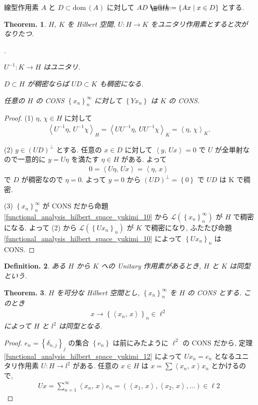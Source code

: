 \documentclass[openany, a4paper, oneside]{jsbook}
\makeatletter
\newcounter{enum2}
\renewenvironment{enumerate}{%
\begin{list}%
{%
\arabic{enum2}.\ \,%
}%
{%
\usecounter{enum2}
\setlength{\itemindent}{0pt}%
\setlength{\leftmargin}{15pt}%
\setlength{\rightmargin}{0pt}%
\setlength{\labelsep}{0pt}%
\setlength{\labelwidth}{6pt}%
\setlength{\itemsep}{0pt}%
\setlength{\parsep}{0pt}%
\setlength{\listparindent}{0pt}%
}
}{%
\end{list}%
}
\newcommand*{\defeq}{\mathrel{\rlap{%
\raisebox{0.3ex}{$\m@th\cdot$}}%
\raisebox{-0.3ex}{$\m@th\cdot$}}%
=}
\newcommand{\dom}{\mathrm{dom}\,}
\theoremstyle{break}
\theoremstyle{breakdefn}
\newtheorem{thm}{Theorem.}[section]
\newtheorem{defn}[thm]{Definition.}
\newcommand{\rbk}[1]{\left (#1\right)}
\newcommand{\cbk}[1]{\left\{#1\right\}}
\newcommand{\bkt}[2]{\left\langle#1,\,#2\right\rangle}
\newcommand{\relmiddle}[1]{\mathrel{}\middle#1\mathrel{}}
\newcommand{\set}[2]{\left\{#1 \relmiddle| #2\right\}}
\newcommand{\calL}{\mathcal{L}}
\makeatother
\begin{document}
線型作用素 $A$ と $D \subset \dom (A)$ に対して $AD \defeq \set{Ax}{x \in D}$ とする.
\begin{thm}
 $H$, $K$ を Hilbert 空間, $U \colon H \to K$ をユニタリ作用素とすると次がなりたつ.
\begin{enumerate}
\item $U^{-1} \colon K \to H$ はユニタリ.
\item $D \subset H$ が稠密ならば $U D \subset K$ も稠密になる.
\item 任意の $H$ の CONS $\cbk{x_n}_n^\infty$ に対して $\cbk{Yx_n}$ は $K$ の CONS.
\end{enumerate}
\end{thm}
\begin{proof}
(1) $\eta$, $\chi \in H$ に対して
\begin{align}
 \bkt{U^{-1} \eta}{U^{-1} \chi}_H
 =
 \bkt{U U^{-1} \eta}{U U^{-1} \chi}_K
 =
 \bkt{\eta}{\chi}_K.
\end{align}

(2) $y \in (UD)^\perp$ とする.
任意の $x \in D$ に対して $\bkt{y}{Ux} = 0$ で $U$ が全単射なので一意的に $y = U\eta$ を満たす $\eta \in H$ がある.
よって
\begin{align}
 0
 =
 \bkt{U \eta}{Ux}
 =
 \bkt{\eta}{x}
\end{align}
で $D$ が稠密なので $\eta = 0$.
よって $y = 0$ から $(UD)^\perp = \cbk{0}$ で $UD$ は K で稠密.

(3) $\cbk{x_n}_n^\infty$ が CONS だから命題 \ref{functional_analysis_hilbert_space_yukimi_10} から
$\calL (\cbk{x_n}_n^\infty)$ が $H$ で稠密になる.
よって (2) から $\calL (\cbk{Ux_n}_n)$ が $K$ で稠密になり,
ふたたび命題 \ref{functional_analysis_hilbert_space_yukimi_10} によって $\cbk{Ux_n}_n$ は CONS.
\end{proof}

\begin{defn}
 ある $H$ から $K$ への Unitary 作用素があるとき, $H$ と $K$ は同型という.
\end{defn}
\begin{thm}\label{functional_analysis_hilbert_space_yukimi_14}
 $H$ を可分な Hilbert 空間とし, $\cbk{x_n}_n^\infty$ を $H$ の CONS とする.
 このとき
 \begin{align}
  x \to \cbk{\bkt{x_n}{x}}_n \in \ell^2
 \end{align}
 によって $H$ と $l^2$ は同型となる.
\end{thm}
\begin{proof}
$e_n = \cbk{\delta_{n,j}}_j$ の集合 $\cbk{e_n}$ は前にみたように $\ell^2$ の CONS だから,
定理 \ref{functional_analysis_hilbert_space_yukimi_12} によって $Ux_n = e_n$ となるユニタリ作用素 $U \colon H \to l^2$ がある.
任意の $x\in H$ は $x = \sum \bkt{x_n}{x} x_n$ とかけるので,
\begin{align}
 Ux
 =
 \sum_{n=1}^{\infty} \bkt{x_n}{x} e_n
 =
 \rbk{\bkt{x_1}{x}, \bkt{x_2}{x}, \dots} \in \ell2
\end{align}
\end{proof}
\end{document}
